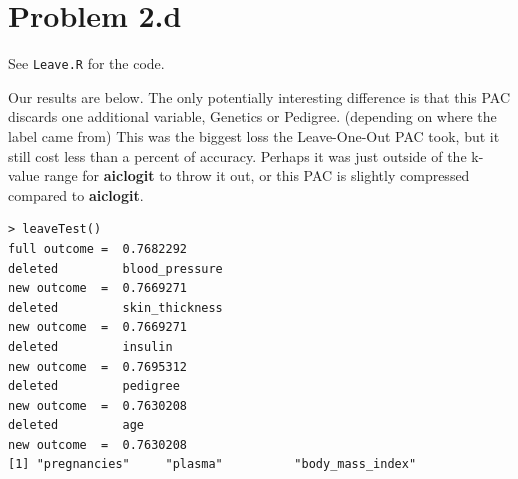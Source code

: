 \documentclass[letter]{article}
\begin{document}

\section{Problem 2.d}

See \texttt{Leave.R} for the code.

Our results are below. The only potentially interesting difference is that this PAC discards one additional variable, Genetics or Pedigree. (depending on where the label came from) This was the biggest loss the Leave-One-Out PAC took, but it still cost less than a percent of accuracy. Perhaps it was just outside of the  k-value range for \textbf{aiclogit} to throw it out, or this PAC is slightly compressed compared to \textbf{aiclogit}.

\begin{verbatim}
> leaveTest()
full outcome =  0.7682292 
deleted         blood_pressure 
new outcome  =  0.7669271 
deleted         skin_thickness 
new outcome  =  0.7669271 
deleted         insulin 
new outcome  =  0.7695312 
deleted         pedigree 
new outcome  =  0.7630208 
deleted         age 
new outcome  =  0.7630208 
[1] "pregnancies"     "plasma"          "body_mass_index"
\end{verbatim}




\end{document}
